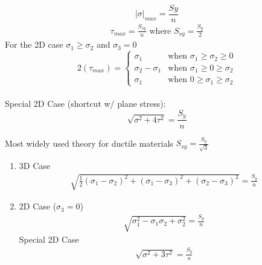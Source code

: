 \vspace{-3pt}
\begin{equation*}
    |\sigma|_{max} = \frac{Sy}{n}
\end{equation*}
\vspace{-12pt}
\begin{align*}
    \tau_{max} = \frac{S_{sy}}{n} \text{  where  } S_{sy}=\frac{S_y}{2}
\end{align*}
For the 2D case $\sigma_1\geq\sigma_2$ and $\sigma_3=0$
        \[2(\tau_{max})= \begin{cases} 
              \sigma_1 & \text{when }\sigma_1 \geq \sigma_2 \geq 0\\
                \sigma_2 - \sigma_1 & \text{when } \sigma_1 \geq 0 \geq \sigma_2\\
                \sigma_1 & \text{when } 0\geq \sigma_1 \geq \sigma_2
           \end{cases}
        \]\\
Special 2D Case (shortcut w/ plane stress):
\begin{equation*}
    \sqrt{\sigma^2+4\tau^2}=\frac{S_y}{n}
\end{equation*}

Most widely used theory for ductile materials
    $S_{sy} = \frac{S_y}{\sqrt{3}}$
    \begin{enumerate}
        \item 3D Case
        \begin{align*}
            \sqrt{\frac{1}{2}(\sigma_1-\sigma_2)^2+(\sigma_1-\sigma_3)^2+(\sigma_2-\sigma_3)^2}= \frac{S_y}{n}
        \end{align*}
        \item 2D Case ($\sigma_3 = 0$)
        \vspace{-10pt}
        \begin{align*}
            \sqrt{\sigma_1^2-\sigma_1\sigma_2+\sigma_2^2}= \frac{S_y}{n}
        \end{align*}
        Special 2D Case
        \vspace{-10pt}
        \begin{align*}
            \sqrt{\sigma^2+3\tau^2}=\frac{S_y}{n}
        \end{align*}
    \end{enumerate}





